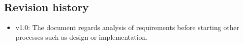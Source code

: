 \subsection{Revision history}
\begin{itemize}
\item v1.0: The document regards analysis of requirements before starting other processes such as design or implementation.
\end{itemize}